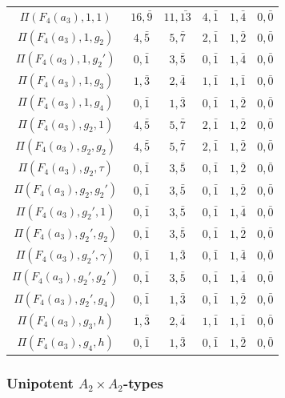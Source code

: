 \begin{table}[h!]
\begin{tabular}{|c|ccccc|}
            $\Pi(F_4(a_3),1,1)$ & $16,\bar{9}$ & $11,\bar{13}$ & $4,\bar1$ & $1,\bar{4}$ & $0,\bar0$ \\
            $\Pi(F_4(a_3),1,g_2)$ & $4,\bar{5}$ & $5,\bar{7}$ & $2,\bar1$ & $1,\bar2$ & $0,\bar0$ \\
            $\Pi(F_4(a_3),1,g_2')$ & $0,\bar1$ & $3,\bar{5}$ & $0,\bar1$ & $1,\bar{4}$ & $0,\bar0$ \\
            $\Pi(F_4(a_3),1,g_3)$ & $1,\bar{3}$ & $2,\bar{4}$ & $1,\bar1$ & $1,\bar1$ & $0,\bar0$ \\
            $\Pi(F_4(a_3),1,g_4)$ & $0,\bar1$ & $1,\bar{3}$ & $0,\bar1$ & $1,\bar2$ & $0,\bar0$ \\\hdashline
            $\Pi(F_4(a_3),g_2,1)$ & $4,\bar{5}$ & $5,\bar{7}$ & $2,\bar1$ & $1,\bar2$ & $0,\bar0$ \\
            $\Pi(F_4(a_3),g_2,g_2)$ & $4,\bar{5}$ & $5,\bar{7}$ & $2,\bar1$ & $1,\bar2$ & $0,\bar0$ \\
            $\Pi(F_4(a_3),g_2,\tau)$ & $0,\bar1$ & $3,\bar{5}$ & $0,\bar1$ & $1,\bar2$ & $0,\bar0$ \\
            $\Pi(F_4(a_3),g_2,g_2')$ & $0,\bar1$ & $3,\bar{5}$ & $0,\bar1$ & $1,\bar2$ & $0,\bar0$ \\\hdashline
            $\Pi(F_4(a_3),g_2',1)$ & $0,\bar1$ & $3,\bar{5}$ & $0,\bar1$ & $1,\bar{4}$ & $0,\bar0$ \\
            $\Pi(F_4(a_3),g_2',g_2)$ & $0,\bar1$ & $3,\bar{5}$ & $0,\bar1$ & $1,\bar2$ & $0,\bar0$ \\
            $\Pi(F_4(a_3),g_2',\gamma)$ & $0,\bar1$ & $1,\bar{3}$ & $0,\bar1$ & $1,\bar4$ & $0,\bar0$ \\
            $\Pi(F_4(a_3),g_2',g_2')$ & $0,\bar1$ & $3,\bar{5}$ & $0,\bar1$ & $1,\bar4$ & $0,\bar0$ \\
            $\Pi(F_4(a_3),g_2',g_4)$ & $0,\bar1$ & $1,\bar{3}$ & $0,\bar1$ & $1,\bar2$ & $0,\bar0$ \\\hdashline
            $\Pi(F_4(a_3),g_3,h)$ & $1,\bar{3}$ & $2,\bar{4}$ & $1,\bar1$ & $1,\bar1$ & $0,\bar0$ \\\hdashline
            $\Pi(F_4(a_3),g_4,h)$ & $0,\bar1$ & $1,\bar{3}$ & $0,\bar1$ & $1,\bar2$ & $0,\bar0$ \\\hline
        \end{tabular}
    \end{table}

    \centering

    \newpage
    \subsubsection*{Unipotent \texorpdfstring{$A_2\times A_2$}{PDFstring}-types}

